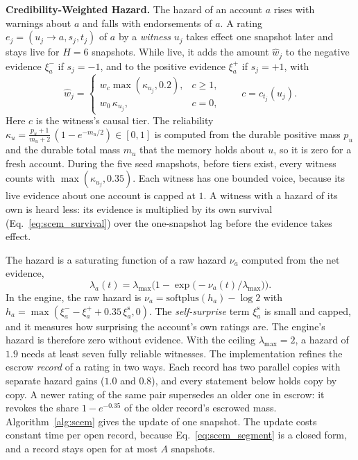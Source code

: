 \documentclass[lettersize,journal]{IEEEtran}
\begin{document}
\smallskip\noindent\textbf{Credibility-Weighted Hazard.}
The hazard of an account $a$ rises with warnings about $a$ and falls with endorsements of $a$.
A rating $e_j = (u_j \to a, s_j, t_j)$ of $a$ by a \emph{witness} $u_j$ takes effect one snapshot later and stays live for $H = 6$ snapshots.
While live, it adds the amount $\hat{w}_j$ to the negative evidence $\xi^-_a$ if $s_j = -1$, and to the positive evidence $\xi^+_a$ if $s_j = +1$, with
\begin{equation}
\label{eq:scem_v1_lag}
\hat{w}_j = \begin{cases}
w_c \max(\kappa_{u_j}, 0.2), & c \ge 1, \\
w_0\, \kappa_{u_j}, & c = 0,
\end{cases}
\qquad c = c_{t_j}(u_j).
\end{equation}
Here $c$ is the witness's causal tier.
The reliability $\kappa_u = \frac{p_u + 1}{m_u + 2}\,(1 - e^{-m_u/2}) \in [0, 1]$ is computed from the durable positive mass $p_u$ and the durable total mass $m_u$ that the memory holds about $u$, so it is zero for a fresh account.
During the five seed snapshots, before tiers exist, every witness counts with $\max(\kappa_{u_j}, 0.35)$.
Each witness has one bounded voice, because its live evidence about one account is capped at $1$. A witness with a hazard of its own is heard less: its evidence is multiplied by its own survival (Eq.~\eqref{eq:scem_survival}) over the one-snapshot lag before the evidence takes effect.

The hazard is a saturating function of a raw hazard $\nu_a$ computed from the net evidence,
\begin{equation}
\label{eq:scem_hazard}
\lambda_a(t) = \lambda_{\max}\Big(1 - \exp\!\big(-\nu_a(t) / \lambda_{\max}\big)\Big).
\end{equation}
In the engine, the raw hazard is $\nu_a = \mathrm{softplus}(h_a) - \log 2$ with $h_a = \max(\xi^-_a - \xi^+_a + 0.35\,\xi^{\mathrm{s}}_a, 0)$. The \emph{self-surprise} term $\xi^{\mathrm{s}}_a$ is small and capped, and it measures how surprising the account's own ratings are. The engine's hazard is therefore zero without evidence.
With the ceiling $\lambda_{\max} = 2$, a hazard of $1.9$ needs at least seven fully reliable witnesses.
The implementation refines the escrow \emph{record} of a rating in two ways.
Each record has two parallel copies with separate hazard gains ($1.0$ and $0.8$), and every statement below holds copy by copy.
A newer rating of the same pair supersedes an older one in escrow: it revokes the share $1 - e^{-0.35}$ of the older record's escrowed mass.
Algorithm~\ref{alg:scem} gives the update of one snapshot. The update costs constant time per open record, because Eq.~\eqref{eq:scem_segment} is a closed form, and a record stays open for at most $A$ snapshots.
\end{document}
